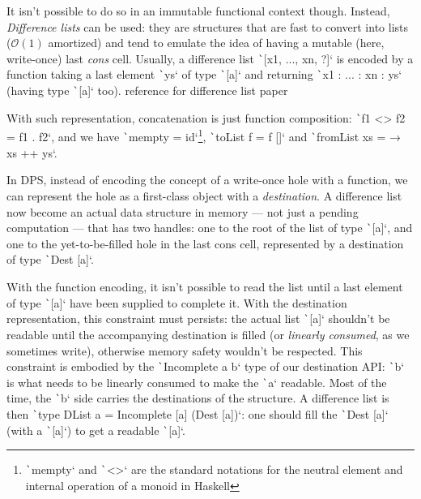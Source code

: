 \documentclass[english]{jflart}
\newcommand{\TODO}[1]{{\color{red}\large #1}}
\begin{document}
It isn't possible to do so in an immutable functional context though. Instead, \emph{Difference lists} can be used: they are structures that are fast to convert into lists ($\mathcal{O}(1)$ amortized) and tend to emulate the idea of having a mutable (here, write-once) last \emph{cons} cell. Usually, a difference list \texttt`[x1, ..., xn, ?]` is encoded by a function taking a last element \texttt`ys` of type \texttt`[a]` and returning \texttt`x1 : ... : xn : ys` (having type \texttt`[a]` too). \TODO{reference for difference list paper}

With such representation, concatenation is just function composition: \texttt`f1 <> f2 = f1 . f2`, and we have \texttt`mempty = id`\footnote{\texttt`mempty` and \texttt`<>` are the standard notations for the neutral element and internal operation of a monoid in Haskell}, \texttt`toList f = f []` and \texttt`fromList xs = \ys → xs ++ ys`.

In DPS, instead of encoding the concept of a write-once hole with a function, we can represent the hole as a first-class object with a \emph{destination}. A difference list now become an actual data structure in memory --- not just a pending computation --- that has two handles: one to the root of the list of type \texttt`[a]`, and one to the yet-to-be-filled hole in the last cons cell, represented by a destination of type \texttt`Dest [a]`.

With the function encoding, it isn't possible to read the list until a last element of type \texttt`[a]` have been supplied to complete it. With the destination representation, this constraint must persists: the actual list \texttt`[a]` shouldn't be readable until the accompanying destination is filled (or \emph{linearly consumed}, as we sometimes write), otherwise memory safety wouldn't be respected. This constraint is embodied by the \texttt`Incomplete a b` type of our destination API: \texttt`b` is what needs to be linearly consumed to make the \texttt`a` readable. Most of the time, the \texttt`b` side carries the destinations of the structure. A difference list is then \texttt`type DList a = Incomplete [a] (Dest [a])`: one should fill the \texttt`Dest [a]` (with a \texttt`[a]`) to get a readable \texttt`[a]`.
\end{document}
